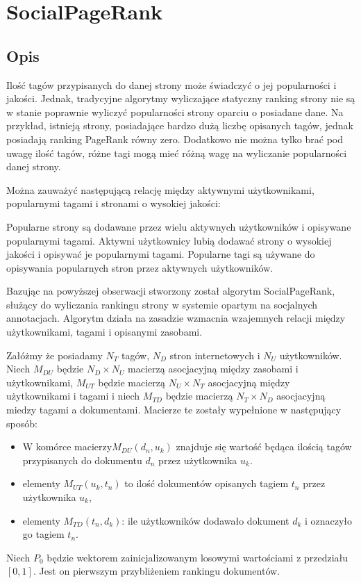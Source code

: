 \section{SocialPageRank}
\subsection{Opis}




Ilość tagów przypisanych do danej strony może świadczyć o jej popularności i jakości. Jednak, tradycyjne algorytmy wyliczające statyczny ranking strony nie są w stanie poprawnie wyliczyć popularności strony  oparciu o posiadane dane. Na przykład, istnieją strony, posiadające bardzo dużą liczbę opisanych tagów, jednak posiadają ranking PageRank równy zero. Dodatkowo nie można tylko brać pod uwagę ilość tagów, różne tagi mogą mieć różną wagę na wyliczanie popularności danej strony. 

Można zauważyć następującą relację między aktywnymi użytkownikami, popularnymi tagami i stronami o wysokiej jakości:
\begin{Observ}
Popularne strony są dodawane przez wielu aktywnych użytkowników i opisywane popularnymi tagami. Aktywni użytkownicy lubią dodawać strony o wysokiej jakości i opisywać je popularnymi tagami. Popularne tagi są używane do opisywania popularnych stron przez aktywnych użytkowników.
\end{Observ}

Bazując na powyższej obserwacji stworzony został algorytm SocialPageRank, służący do wyliczania rankingu strony w systemie opartym na socjalnych annotacjach. Algorytm działa na zasadzie wzmacnia wzajemnych relacji między użytkownikami, tagami i opisanymi zasobami.

Załóżmy że posiadamy $N_T$ tagów, $N_D$ stron internetowych i $N_U$ użytkowników. Niech $M_{DU}$ będzie  $N_D \times N_U$  macierzą asocjacyjną między zasobami i użytkownikami, $M_{UT}$ będzie macierzą $N_U \times N_T$ asocjacyjną między użytkownikami i tagami i niech $M_{TD}$ będzie macierzą  $N_T \times N_D$  asocjacyjną miedzy tagami a dokumentami. Macierze te zostały wypełnione w następujący sposób:
\begin{itemize}
\item W komórce macierzy$M_{DU}(d_n, u_k)$ znajduje się wartość będąca ilością tagów przypisanych do dokumentu $d_n$ przez użytkownika $u_k$. 
\item elementy $M_{UT}(u_k, t_n)$ to ilość dokumentów opisanych tagiem $t_n$ przez użytkownika $u_k$,
\item elementy $M_{TD}(t_n, d_k)$: ile użytkowników dodawało dokument $d_k$ i oznaczyło go tagiem $t_n$. 
\end{itemize}
Niech $P_0$ będzie wektorem zainicjalizowanym losowymi wartościami z przedziału $[0,1]$. Jest on pierwszym przybliżeniem rankingu dokumentów.

